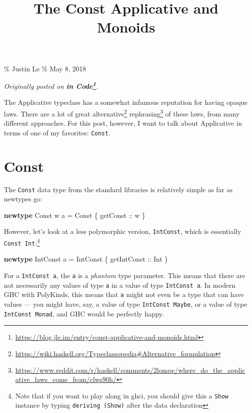 \documentclass[]{article}
\title{The Const Applicative and Monoids}
\newenvironment{Shaded}{}{}
\newcommand{\DataTypeTok}[1]{\textcolor[rgb]{0.56,0.13,0.00}{#1}}
\newcommand{\KeywordTok}[1]{\textcolor[rgb]{0.00,0.44,0.13}{\textbf{#1}}}
\newcommand{\NormalTok}[1]{#1}
\newcommand{\OtherTok}[1]{\textcolor[rgb]{0.00,0.44,0.13}{#1}}
\renewcommand{\href}[2]{#2\footnote{\url{#1}}}
\begin{document}
\maketitle

\% Justin Le \% May 8, 2018

\emph{Originally posted on
\textbf{\href{https://blog.jle.im/entry/const-applicative-and-monoids.html}{in
Code}}.}

The Applicative typeclass has a somewhat infamous reputation for having opaque
laws. There are a lot of great
\href{https://wiki.haskell.org/Typeclassopedia\#Alternative_formulation}{alternative}
\href{https://www.reddit.com/r/haskell/comments/2lompe/where_do_the_applicative_laws_come_from/clws90h/}{rephrasing}
of these laws, from many different approaches. For this post, however, I want to
talk about Applicative in terms of one of my favorites: \texttt{Const}.

\section{Const}\label{const}

The \texttt{Const} data type from the standard libraries is relatively simple as
far as newtypes go:

\begin{Shaded}
\begin{Highlighting}[]
\KeywordTok{newtype} \DataTypeTok{Const}\NormalTok{ w a }\OtherTok{=} \DataTypeTok{Const}\NormalTok{ \{}\OtherTok{ getConst ::}\NormalTok{ w \}}
\end{Highlighting}
\end{Shaded}

However, let's look at a less polymorphic version, \texttt{IntConst}, which is
essentially \texttt{Const\ Int}:\footnote{Note that if you want to play along in
  ghci, you should give this a \texttt{Show} instance by typing
  \texttt{deriving\ (Show)} after the data declaration}

\begin{Shaded}
\begin{Highlighting}[]
\KeywordTok{newtype} \DataTypeTok{IntConst}\NormalTok{ a }\OtherTok{=} \DataTypeTok{IntConst}\NormalTok{ \{}\OtherTok{ getIntConst ::} \DataTypeTok{Int}\NormalTok{ \}}
\end{Highlighting}
\end{Shaded}

For a \texttt{IntConst\ a}, the \texttt{a} is a \emph{phantom} type parameter.
This means that there are not necessarily any values of type \texttt{a} in a
value of type \texttt{IntConst\ a}. In modern GHC with PolyKinds, this means
that \texttt{a} might not even be a type that can have values --- you might
have, say, a value of type \texttt{IntConst\ Maybe}, or a value of type
\texttt{IntConst\ Monad}, and GHC would be perfectly happy.
\end{document}
